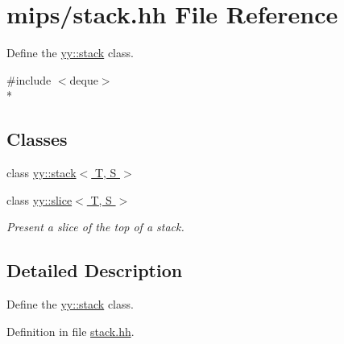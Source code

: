 \hypertarget{stack_8hh}{\section{mips/stack.hh File Reference}
\label{stack_8hh}
}


Define the \hyperlink{classyy_1_1stack}{yy\-::stack} class.  


{\ttfamily \#include $<$deque$>$}\\*
\subsection*{Classes}
\begin{DoxyCompactItemize}
\item 
class \hyperlink{classyy_1_1stack}{yy\-::stack$<$ T, S $>$}
\item 
class \hyperlink{classyy_1_1slice}{yy\-::slice$<$ T, S $>$}
\begin{DoxyCompactList}\small\item\em Present a slice of the top of a stack. \end{DoxyCompactList}\end{DoxyCompactItemize}


\subsection{Detailed Description}
Define the \hyperlink{classyy_1_1stack}{yy\-::stack} class. 

Definition in file \hyperlink{stack_8hh_source}{stack.\-hh}.

